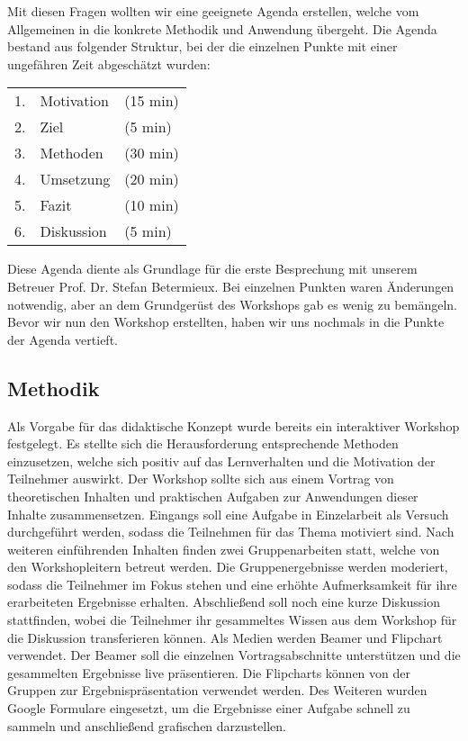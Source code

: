 Mit diesen Fragen wollten wir eine geeignete Agenda erstellen, welche vom Allgemeinen in die konkrete Methodik und Anwendung übergeht. Die Agenda bestand aus folgender Struktur, bei der die einzelnen Punkte mit einer ungefähren Zeit abgeschätzt wurden:

\begin{center}
	\begin{tabular}{r l  l}
		1.&Motivation	&(15 min) \\
		2.&Ziel		&	(5 min) \\
		3.&Methoden	&	(30 min) \\
		4.&Umsetzung	&	(20 min) \\ 
		5.&Fazit		&	(10 min) \\
		6.&Diskussion	&(5 min) \\
	\end{tabular}
\end{center}

Diese Agenda diente als Grundlage für die erste Besprechung mit unserem Betreuer Prof. Dr. Stefan Betermieux. Bei einzelnen Punkten waren Änderungen notwendig, aber an dem Grundgerüst des Workshops gab es wenig zu bemängeln. Bevor wir nun den Workshop erstellten, haben wir uns nochmals in die Punkte der Agenda vertieft. 


\subsection{Methodik}  
Als Vorgabe für das didaktische Konzept wurde bereits ein interaktiver Workshop festgelegt. Es stellte sich die Herausforderung entsprechende Methoden einzusetzen, welche sich positiv auf das Lernverhalten und die Motivation der Teilnehmer auswirkt. Der Workshop sollte sich aus einem Vortrag von theoretischen Inhalten und praktischen Aufgaben zur Anwendungen dieser Inhalte zusammensetzen. Eingangs soll eine  Aufgabe in Einzelarbeit als Versuch durchgeführt werden, sodass die Teilnehmen für das Thema motiviert sind. Nach weiteren einführenden Inhalten finden zwei Gruppenarbeiten statt, welche von den Workshopleitern betreut werden. Die Gruppenergebnisse werden moderiert, sodass die Teilnehmer im Fokus stehen und eine erhöhte Aufmerksamkeit für ihre erarbeiteten Ergebnisse erhalten. Abschließend soll noch eine kurze Diskussion stattfinden, wobei die Teilnehmer ihr gesammeltes Wissen aus dem Workshop für die Diskussion transferieren können. Als Medien werden Beamer und Flipchart verwendet. Der Beamer soll die einzelnen Vortragsabschnitte unterstützen und die gesammelten Ergebnisse live präsentieren. Die Flipcharts können von der Gruppen zur Ergebnispräsentation verwendet werden. Des Weiteren wurden Google Formulare eingesetzt, um die Ergebnisse einer Aufgabe schnell zu sammeln und anschließend grafischen darzustellen.




